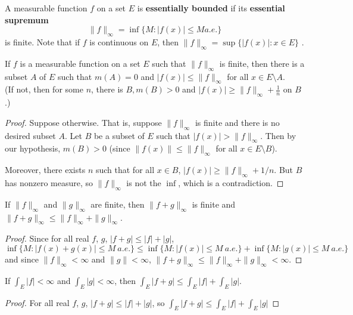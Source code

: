\begin{defn}%
	A measurable function $f$ on a set $E$ is \textbf{essentially bounded} if its 
	\textbf{essential supremum} 
	\begin{equation*}
		\|f\|_\infty = \inf\{M: |f(x)| \le M a.e.\}
	\end{equation*}
	is finite. Note that if $f$ is continuous on $E$, then $\|f\|_\infty=\sup\{|f(x)|:x\in E\}$ . 
\end{defn}

\begin{pblm}%
	If $f$ is a measurable function on a set $E$ such that $\|f\|_\infty$ is finite, then 
	there is a subset $A$ of $E$ such that $m(A) = 0$ and $|f(x)| \le \|f\|_\infty$ for all 
	$x \in E\setminus A$. \\
	{\scriptsize{(If not, then for some $n$, there is $B, m(B) > 0$ and $|f(x)|\ge\|f\|_\infty + \frac{1}{n}$ 
	on $B$.)}}
\begin{proof}
	Suppose otherwise. That is, suppose $\|f\|_{\infty}$ is finite and there is no desired subset 
	$A$. Let $B$ be a subset of $E$ such that $|f(x)|>\|f\|_{\infty}$. Then by our hypothesis, 
	$m(B)>0$ (since $\|f(x)\| \leq \|f\|_{\infty}$ for all $x \in E\setminus B$). 
	
	Moreover, there exists $n$ such that for all $x \in B$, $|f(x)| \geq \|f\|_{\infty} + 1/n$. 
	But $B$ has nonzero measure, so $\|f\|_{\infty}$ is not the $\inf$, which is a contradiction.
\end{proof}
\end{pblm}

\begin{pblm}%
	If $\|f\|_\infty$ and $\|g\|_\infty$ are finite, then $\|f+g\|_\infty$ is finite and 
	$\|f+g\|_\infty \le \|f\|_\infty+\|g\|_\infty$. 
\begin{proof}
	Since for all real $f$, $g$, $|f + g| \le |f|+|g|$, 
	\begin{equation*}
		\inf\{M: |f(x) + g(x)| \le M ~ a.e.\} \le \inf\{M:|f(x)| \le M ~ a.e.\} + \inf\{M: |g(x)| \le M ~ a.e.\} 
	\end{equation*}
	and since $\|f\|_\infty < \infty$ and $\|g\| < \infty$, $\|f + g\|_\infty \le \|f\|_\infty + \|g\|_\infty < \infty$. 
\end{proof}
\end{pblm}

\begin{pblm}%
	If $\int_E|f|<\infty$ and $\int_E|g|<\infty$, then $\int_E|f+g|\le\int_E|f|+\int_E|g|$. 
\begin{proof}
	For all real $f$, $g$,  $|f + g| \le |f| + |g|$, so $\int_E|f + g|\le \int_E|f| + \int_E|g|$
\end{proof}
\end{pblm}

